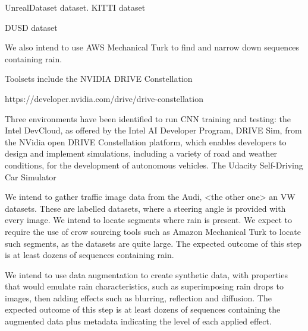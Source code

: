 UnrealDataset dataset.
KITTI dataset



DUSD dataset

We also intend to use AWS Mechanical Turk to find and narrow down sequences containing rain.

\lipsum[8]

Toolsets include the NVIDIA DRIVE Constellation

https://developer.nvidia.com/drive/drive-constellation

Three environments have been identified to run CNN training and testing: the Intel DevCloud, as offered by the Intel AI Developer Program, DRIVE Sim, from the NVidia open DRIVE Constellation platform, which enables developers to design and implement simulations, including a variety of road and weather conditions, for the development of autonomous vehicles.
The Udacity Self-Driving Car Simulator
\lipsum[9]

We intend to gather traffic image data from the Audi, <the other one> an VW datasets. These are labelled datasets, where a steering angle is provided with every image. We intend to locate segments where rain is present. We expect to require the use of crow sourcing tools such as Amazon Mechanical Turk to locate such segments, as the datasets are quite large.
The expected outcome of this step is at least dozens of sequences containing rain.

We intend to use data augmentation to create synthetic data, with properties that would emulate rain characteristics, such as superimposing rain drops to images, then adding effects such as blurring, reflection and diffusion.  
The expected outcome of this step is at least dozens of sequences containing the augmented data plus metadata indicating the level of each applied effect.
